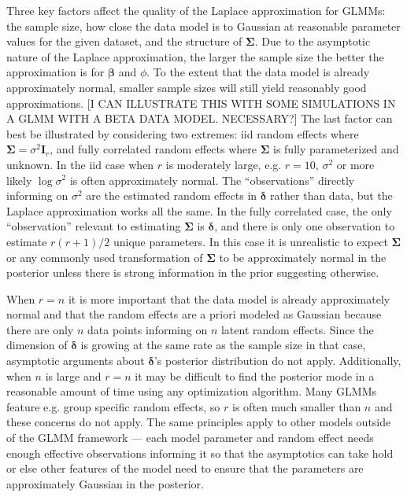 \documentclass[12pt]{article}
\begin{document}
Three key factors affect the quality of the Laplace approximation for GLMMs: the sample size, how close the data model is to Gaussian at reasonable parameter values for the given dataset, and the structure of $\bm{\Sigma}$. Due to the asymptotic nature of the Laplace approximation, the larger the sample size the better the approximation is for $\bm{\beta}$ and $\phi$. To the extent that the data model is already approximately normal, smaller sample sizes will still yield reasonably good approximations. [I CAN ILLUSTRATE THIS WITH SOME SIMULATIONS IN A GLMM WITH A BETA DATA MODEL. NECESSARY?] The last factor can best be illustrated by considering two extremes: iid random effects where $\bm{\Sigma} = \sigma^2\bm{I}_r$, and fully correlated random effects where $\bm{\Sigma}$ is fully parameterized and unknown. In the iid case when $r$ is moderately large, e.g. $r=10$, $\sigma^2$ or more likely $\log\sigma^2$ is often approximately normal. The ``observations'' directly informing on $\sigma^2$ are the estimated random effects in $\bm{\delta}$ rather than data, but the Laplace approximation works all the same. In the fully correlated case, the only ``observation'' relevant to estimating $\bm{\Sigma}$ is $\bm{\delta}$, and there is only one observation to estimate $r(r+1)/2$ unique parameters. In this case it is unrealistic to expect $\bm{\Sigma}$ or any commonly used transformation of $\bm{\Sigma}$ to be approximately normal in the posterior unless there is strong information in the prior suggesting otherwise. 

When $r=n$ it is more important that the data model is already approximately normal and that the random effects are a priori modeled as Gaussian because there are only $n$ data points informing on $n$ latent random effects. Since the dimension of $\bm{\delta}$ is growing at the same rate as the sample size in that case, asymptotic arguments about $\bm{\delta}$'s posterior distribution do not apply. Additionally, when $n$ is large and $r=n$ it may be difficult to find the posterior mode in a reasonable amount of time using any optimization algorithm. Many GLMMs feature e.g. group specific random effects, so $r$ is often much smaller than $n$ and these concerns do not apply. The same principles apply to other models outside of the GLMM framework --- each model parameter and random effect needs enough effective observations informing it so that the asymptotics can take hold or else other features of the model need to ensure that the parameters are approximately Gaussian in the posterior.
\end{document}
